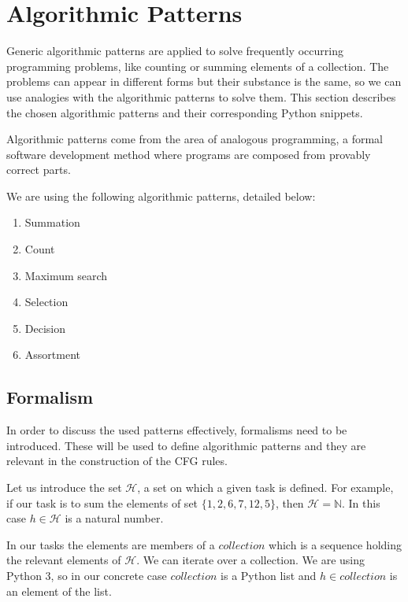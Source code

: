 \section{Algorithmic Patterns}
\label{sec:pattern}

Generic algorithmic patterns\cite{progT, progT1} are applied to
solve frequently occurring programming problems, like counting
or summing elements of a collection\cite{progSolve}. The problems can appear in different forms
but their substance is the same, so we can use analogies with the algorithmic
patterns to solve them. This section describes the chosen algorithmic patterns
and their corresponding Python snippets.

Algorithmic patterns come from the area of analogous programming\cite{progT}, a
formal software development method where programs are composed from provably
correct parts.

We are using the following algorithmic patterns, detailed below:

\begin{enumerate}[noitemsep]
  \item Summation
  \item Count
  \item Maximum search
  \item Selection
  \item Decision
  \item Assortment
\end{enumerate}

\subsection{Formalism}\label{sec:def}

In order to discuss the used patterns effectively, formalisms need to be
introduced. These will be used to define algorithmic patterns and they are
relevant in the construction of the CFG rules.

Let us introduce the set \( \mathcal{H} \), a set on which a given task is
defined. For example, if our task is to sum the elements of set
\( \{ 1, 2, 6, 7, 12, 5 \} \), then \( \mathcal{H} = \mathbb{N} \). In this case
\( h \in \mathcal{H} \) is a natural number.

In our tasks the elements are members of a \( collection \) which is a sequence
holding the relevant elements of \( \mathcal{H} \). We can iterate over a
collection. We are using Python 3, so in our concrete case \( collection \) is a
Python list and \( h \in collection \) is an element of the list.

